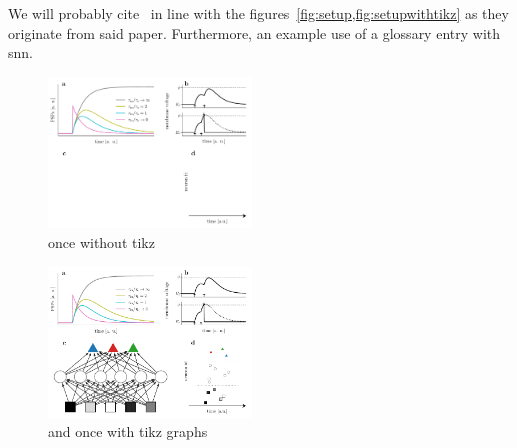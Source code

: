 We will probably cite~\cite{goeltz2020fast} in line with the figures~\cref{fig:setup,fig:setupwithtikz} as they originate from said paper.
Furthermore, an example use of a glossary entry with \gls{snn}.

\lipsum[2]


\begin{figure}
  \centering
  \includegraphics[width=0.48\textwidth]{fig/figSetup.pdf}
  \caption{
      once without tikz
  }\label{fig:setup}
\end{figure}



\begin{figure}
  \centering
  \includegraphics[width=0.48\textwidth]{fig_tikz/figSetup/figSetup.pdf}
  \caption{
      and once with tikz graphs
  }\label{fig:setupwithtikz}
\end{figure}
